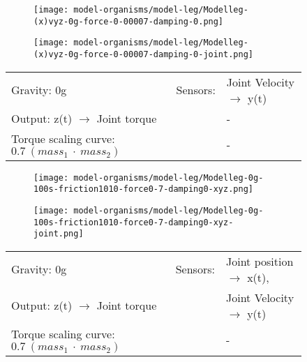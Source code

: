 \documentclass[main]{subfiles}
\begin{document}
\begin{figure}[H]
	\centering
		\begin{subfigure}[c]{0.45\textwidth}
	\texttt{[image: model-organisms/model-leg/Modelleg-(x)vyz-0g-force-0-00007-damping-0.png]}
		\end{subfigure}
	\begin{subfigure}[c]{0.45\textwidth}
	\texttt{[image: model-organisms/model-leg/Modelleg-(x)vyz-0g-force-0-00007-damping-0-joint.png]}
		\end{subfigure}
	\caption[Limited chaotic controller controlling model leg]{}
	\begin{tabular}{l|ll}
	\hline 
	Gravity: 0g  & Sensors: & Joint Velocity \(\rightarrow\) y(t)\\
	 Output: z(t) \(\rightarrow\) Joint torque &  & - \\
	  Torque scaling curve: \(0.7~(mass_1~\cdot~mass_2)\) & & - \\
	  \hline
	\end{tabular}

	\label{figure:limited-model-leg4}
\end{figure}

\begin{figure}[H]
	\centering
		\begin{subfigure}[c]{0.45\textwidth}
	\texttt{[image: model-organisms/model-leg/Modelleg-0g-100s-friction1010-force0-7-damping0-xyz.png]}
		\end{subfigure}
	\begin{subfigure}[c]{0.45\textwidth}
	\texttt{[image: model-organisms/model-leg/Modelleg-0g-100s-friction1010-force0-7-damping0-xyz-joint.png]}
		\end{subfigure}
	\caption[Limited chaotic controller controlling model leg]{}
	\begin{tabular}{l|ll}
	\hline 
	Gravity: 0g  & Sensors: & Joint position \(\rightarrow\) x(t),\\
	 Output: z(t) \(\rightarrow\) Joint torque &  & Joint Velocity \(\rightarrow\) y(t) \\
	  Torque scaling curve: \(0.7~(mass_1~\cdot~mass_2)\) & & - \\
	  \hline
	\end{tabular}

	\label{figure:limited-model-leg5}
\end{figure}
\end{document}
